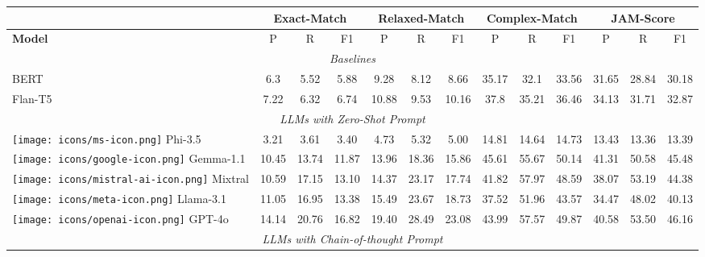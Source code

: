 \begin{table*}[h!]
\small
\centering
\renewcommand*{\arraystretch}{1}

\begin{tabular}{l|ccc|ccc|ccc|ccc}
 & \multicolumn{3}{c}{\textbf{Exact-Match}}& \multicolumn{3}{c}{\textbf{Relaxed-Match}} & \multicolumn{3}{c}{\textbf{Complex-Match}}& \multicolumn{3}{c}{\textbf{JAM-Score}} \\
\midrule
\textbf{Model}& P & R & F1 & P & R & F1  & P & R & F1 & P & R & F1\\
\midrule

\multicolumn{13}{c}{\textit{Baselines}}\\
\midrule
BERT & 6.3	& 5.52	& 5.88	& 9.28	& 8.12	& 8.66 &	35.17 & 32.1 & 33.56 & 31.65 & 28.84& 30.18 \\

Flan-T5 & 7.22 & 6.32 & 6.74 & 10.88 & 9.53 & 10.16 & 37.8 & 35.21 & 36.46 & 34.13 & 31.71 & 32.87 \\

\midrule
\multicolumn{13}{c}{\textit{LLMs with Zero-Shot Prompt}}\\
\midrule

\texttt{[image: icons/ms-icon.png]} Phi-3.5 & 3.21 & 3.61 & 3.40 & 4.73 & 5.32 & 5.00 & 14.81 & 14.64 & 14.73 & 13.43 & 13.36 & 13.39 \\
\texttt{[image: icons/google-icon.png]} Gemma-1.1 & 10.45 & 13.74 & 11.87 & 13.96 & 18.36 & 15.86 & 45.61 & 55.67 & 50.14 & 41.31 & 50.58 & 45.48 \\
\texttt{[image: icons/mistral-ai-icon.png]} Mixtral & 10.59 & 17.15 & 13.10 & 14.37 & 23.17 & 17.74 & 41.82 & 57.97 & 48.59 & 38.07 & 53.19 & 44.38 \\
\texttt{[image: icons/meta-icon.png]} Llama-3.1 & 11.05 & 16.95 & 13.38 & 15.49 & 23.67 & 18.73 & 37.52 & 51.96 & 43.57 & 34.47 & 48.02 & 40.13 \\
\texttt{[image: icons/openai-icon.png]} GPT-4o & 14.14 & 20.76 & 16.82 & 19.40 & 28.49 & 23.08 & 43.99 & 57.57 & 49.87 & 40.58 & 53.50 & 46.16\\

\midrule
\multicolumn{13}{c}{\textit{LLMs with Chain-of-thought Prompt}}\\
\midrule


\end{tabular}
\end{table*}
